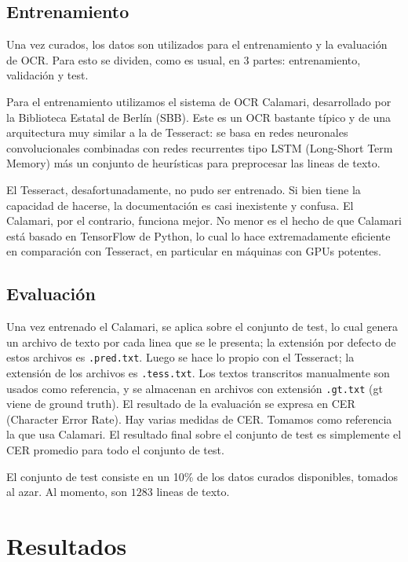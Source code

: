 \documentclass{article}
\begin{document}
\subsection{Entrenamiento}

Una vez curados, los datos son utilizados para el entrenamiento y la evaluación de OCR.
Para esto se dividen, como es usual, en 3 partes: entrenamiento, validación y test.

Para el entrenamiento utilizamos el sistema de OCR Calamari, desarrollado por
la Biblioteca Estatal de Berlín (SBB).  Este es un OCR bastante típico y
de una arquitectura muy similar a la de Tesseract: se basa en redes neuronales
convolucionales combinadas con redes recurrentes tipo LSTM (Long-Short Term Memory)
más un conjunto de heurísticas para preprocesar las lineas de texto.

El Tesseract, desafortunadamente, no pudo ser entrenado. Si bien tiene la capacidad
de hacerse, la documentación es casi inexistente y confusa. El Calamari, por el contrario,
funciona mejor.
No menor es el hecho de que Calamari está basado en TensorFlow de Python, lo cual
lo hace extremadamente eficiente en comparación con Tesseract, en particular en máquinas
con GPUs potentes.

\subsection{Evaluación}

Una vez entrenado el Calamari, se aplica sobre el conjunto de test, lo cual genera un archivo de texto
por cada linea que se le presenta; la extensión por defecto de estos archivos es \texttt{.pred.txt}.
Luego se hace lo propio con el Tesseract; la extensión de los archivos es \texttt{.tess.txt}.
Los textos transcritos manualmente son usados como referencia, y se almacenan en archivos con extensión
\texttt{.gt.txt} (gt viene de ground truth).
El resultado de la evaluación se expresa en CER (Character Error Rate). Hay varias medidas de CER.
Tomamos como referencia la que usa Calamari. El resultado final sobre el conjunto de test es simplemente
el CER promedio para todo el conjunto de test.

El conjunto de test consiste en un 10\% de los datos curados disponibles, tomados al azar.
Al momento, son $1283$ lineas de texto.

\section{Resultados}
\end{document}
